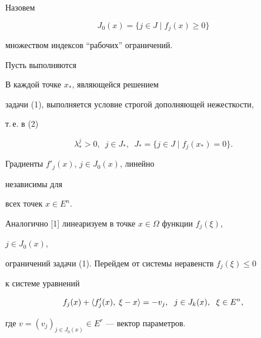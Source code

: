  


Назовем 


$$ 


J_0(x)=\{j\in J\mid f_j(x)\ge 0\} 


$$ 


множеством индексов ``рабочих'' ограничений. 


 


Пусть выполняются 


 


\begin{cond} В каждой точке $x_*$, являющейся решением 


задачи (1), выполняется условие строгой дополняющей нежесткости, 


т.\,е.{} в (2) 


$$ 


\lambda^j_*>0,\ \;j\in J_*,\ \; J_*= 


\{j\in J\mid f_j(x_*)=0\}. 


$$ 


\end{cond} 


 


\begin{cond} Градиенты $f'_j(x)$, $j\in J_0(x)$, линейно 


независимы для 


всех точек $x\in E^n$. 


\end{cond} 


 


Аналогично [1] линеаризуем в точке $x\in\Omega$ функции $f_j(\xi)$, 


$j\in J_0(x)$, 


ограничений задачи (1). Перейдем от системы неравенств $f_j(\xi)\le 0$ 


к системе уравнений 


\begin{equation} 


f_j(x)+\la f'_j(x),\;\xi-x\ra=-v_j,\ \; j\in J_k(x), 


\ \;\xi\in E^n, 


\end{equation} 


где $v=(v_j)_{j\in J_0(x)}\in E^r$ --- вектор параметров. 


 


